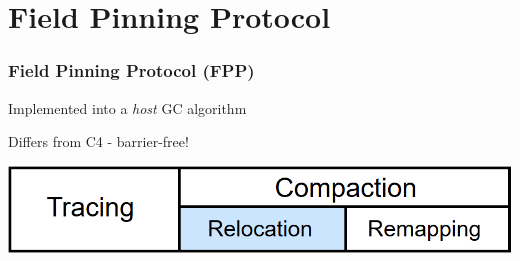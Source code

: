 \documentclass{beamer}
\newcommand{\linespace}{\vskip 0.25cm}
\begin{document}
%
%
%
%
%
%
%
%
%
%
%



\section[FPP]{Field Pinning Protocol}

\begin{frame}

\frametitle{Field Pinning Protocol (FPP)}

Implemented into a \emph{host} GC algorithm

\linespace
\linespace

Differs from C4 - barrier-free!

\linespace
\linespace
\linespace

\begin{center}
\includegraphics[width=.85\textwidth]{Illustrations/gc_cycle_locator_relocation.png}
\end{center}

\end{frame}
\end{document}
